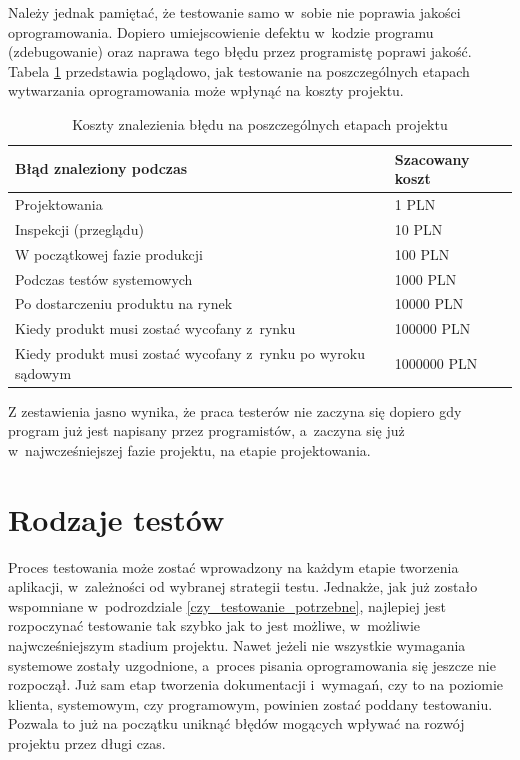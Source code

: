 Należy jednak pamiętać, że testowanie samo w~sobie nie poprawia jakości oprogramowania. Dopiero umiejscowienie defektu w~kodzie programu (zdebugowanie) oraz naprawa tego błędu przez programistę poprawi jakość. Tabela \ref{tab:koszty_bledu} przedstawia poglądowo, jak testowanie na poszczególnych etapach wytwarzania oprogramowania może wpłynąć na koszty projektu.

\begin{table}[]
\centering
\caption{Koszty znalezienia błędu na poszczególnych etapach projektu}
\label{tab:koszty_bledu}
\begin{tabular}{|l|l|}
\hline
\textbf{Błąd znaleziony podczas} & \textbf{Szacowany koszt} \\ \hline
Projektowania & 1 PLN	\\ \hline
Inspekcji (przeglądu) & 10 PLN	\\ \hline
W początkowej fazie produkcji & 100 PLN	\\ \hline
Podczas testów systemowych & 1000 PLN	\\ \hline
Po dostarczeniu produktu na rynek & 10000 PLN	\\ \hline
Kiedy produkt musi zostać wycofany z~rynku & 100000 PLN	\\ \hline
Kiedy produkt musi zostać wycofany z~rynku po wyroku sądowym & 1000000 PLN	\\ \hline
\end{tabular}
\end{table}

Z zestawienia jasno wynika, że praca testerów nie zaczyna się dopiero gdy program już jest napisany przez programistów, a~zaczyna się już w~najwcześniejszej fazie projektu, na etapie projektowania.

\section{Rodzaje testów}
Proces testowania może zostać wprowadzony na każdym etapie tworzenia aplikacji, w~zależności od wybranej strategii testu. Jednakże, jak już zostało wspomniane w~podrozdziale \ref{czy_testowanie_potrzebne}, najlepiej jest rozpoczynać testowanie tak szybko jak to jest możliwe, w~możliwie najwcześniejszym stadium projektu. Nawet jeżeli nie wszystkie wymagania systemowe zostały uzgodnione, a~proces pisania oprogramowania się jeszcze nie rozpoczął. Już sam etap tworzenia dokumentacji i~wymagań, czy to na poziomie klienta, systemowym, czy programowym, powinien zostać poddany testowaniu. Pozwala to już na początku uniknąć błędów mogących wpływać na rozwój projektu przez długi czas.

